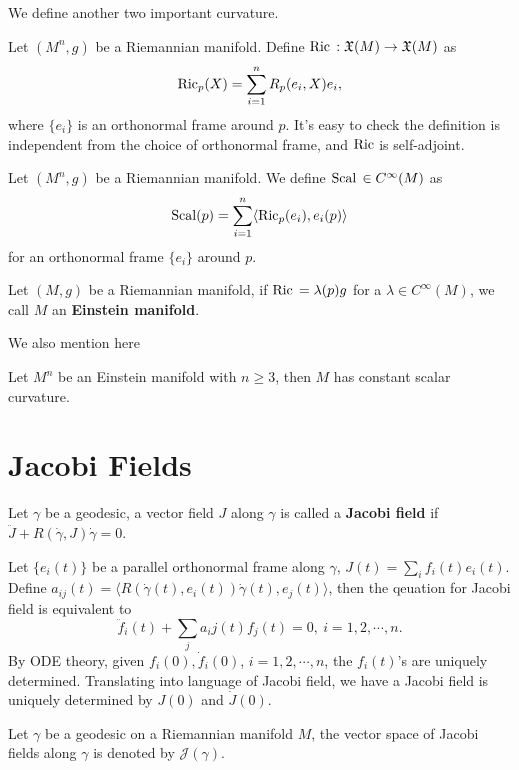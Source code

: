 We define another two important curvature.
\begin{defn}
    Let $(M^n,g)$ be a Riemannian manifold.
    Define $\operatorname{Ric}{}:\mathfrak{X}(M)\to\mathfrak{X}(M)$ as
    \[\operatorname{Ric}_p(X)=\sum_{i=1}^nR_p(e_i,X)e_i,\]
    where $\{e_i\}$ is an orthonormal frame around $p$.
    It's easy to check the definition is independent from the choice of orthonormal frame, and $\operatorname{Ric}$ is self-adjoint.
\end{defn}

\begin{defn}
    Let $(M^n,g)$ be a Riemannian manifold.
    We define $\operatorname{Scal}{}\in C^\infty(M)$ as
    \[\operatorname{Scal}(p)=\sum_{i=1}^n\langle\operatorname{Ric}_p(e_i),e_i(p)\rangle\]
    for an orthonormal frame $\{e_i\}$ around $p$.
\end{defn}

\begin{defn}
    Let $(M,g)$ be a Riemannian manifold, if $\operatorname{Ric}{}=\lambda(p)g$ for a $\lambda\in C^\infty(M)$, we call $M$ an \textbf{Einstein manifold}.
\end{defn}

We also mention here
\begin{thm}[Schur]
    Let $M^n$ be an Einstein manifold with $n\geq 3$, then $M$ has constant scalar curvature.    
\end{thm}

\section{Jacobi Fields}

\begin{defn}
    Let $\gamma$ be a geodesic, a vector field $J$ along $\gamma$ is called a \textbf{Jacobi field} if $\ddot{J}+R(\dot{\gamma},J)\dot{\gamma}=0$.
\end{defn}

Let $\{e_i(t)\}$ be a parallel orthonormal frame along $\gamma$, $J(t)=\sum_if_i(t)e_i(t)$.
Define $a_{ij}(t)=\langle R(\dot{\gamma}(t),e_i(t))\dot{\gamma}(t),e_j(t)\rangle$, then the qeuation for Jacobi field is equivalent to
\[\ddot{f}_i(t)+\sum_ja_ij(t)f_j(t)=0,\ i=1,2,\cdots,n.\]
By ODE theory, given $f_i(0),\dot{f}_i(0)$, $i=1,2,\cdots,n$, the $f_i(t)$'s are uniquely determined.
Translating into language of Jacobi field, we have a Jacobi field is uniquely determined by $J(0)$ and $\dot{J}(0)$.

\begin{symb}
    Let $\gamma$ be a geodesic on a Riemannian manifold $M$, the vector space of Jacobi fields along $\gamma$ is denoted by $\mathscr{J}(\gamma)$.
\end{symb}

